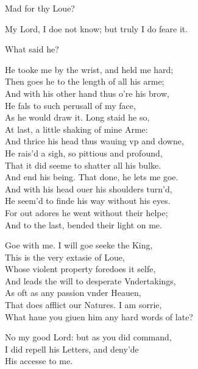 \documentclass[a5paper,DIV=calc,11pt]{scrbook}
\begin{document}
\begin{drama*}
    \polspeaks Mad for thy Loue?
    
    \ophespeaks My Lord, I doe not know; but truly I do feare it.
    
    \polspeaks What said he?
    
    \ophespeaks He tooke me by the wrist, and held me hard;\\
    Then goes he to the length of all his arme;\\
    And with his other hand thus o're his brow,\\
    He fals to such perusall of my face,\\
    As he would draw it. Long staid he so,\\
    At last, a little shaking of mine Arme:\\
    And thrice his head thus wauing vp and downe,\\
    He rais'd a sigh, so pittious and profound,\\
    That it did seeme to shatter all his bulke.\\
    And end his being. That done, he lets me goe.\\
    And with his head ouer his shoulders turn'd,\\
    He seem'd to finde his way without his eyes.\\
    For out adores he went without their helpe;\\
    And to the last, bended their light on me.
    
    \polspeaks Goe with me. I will goe seeke the King,\\
    This is the very extasie of Loue,\\
    Whose violent property foredoes it selfe,\\
    And leads the will to desperate Vndertakings,\\
    As oft as any passion vnder Heauen,\\
    That does afflict our Natures. I am sorrie,\\
    What haue you giuen him any hard words of late?
    
    \ophespeaks No my good Lord: but as you did command,\\
    I did repell his Letters, and deny'de\\
    His accesse to me.
    

\end{drama*}
\end{document}
